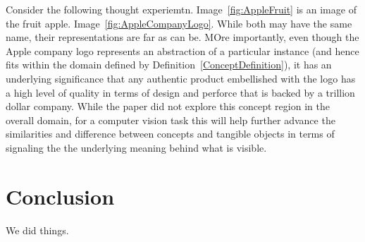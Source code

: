\documentclass[conference]{IEEEtran}
\begin{document}
Consider the following thought experiemtn. Image~\ref{fig:AppleFruit} is an
image of the fruit apple. Image~\ref{fig:AppleCompanyLogo}. While both may have
the same name, their representations are far as can be. MOre importantly, even
though the Apple company logo represents an abstraction of a particular
instance (and hence fits within the domain defined by
Definition~\ref{ConceptDefinition}), it has an underlying significance that any
authentic product embellished with the logo has a high level of quality in terms
of design and perforce that is backed by a trillion dollar company. While the
paper did not explore this concept region in the overall domain, for a computer
vision task this will help further advance the similarities and difference
between concepts and tangible objects in terms of signaling the the underlying
meaning behind what is visible.







\section{Conclusion} %



We did things.





{\printbibliography}

\appendix
\end{document}
